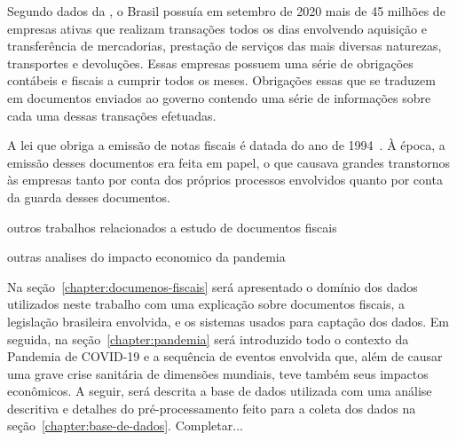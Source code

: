\newcommand{\comando}[1]{\textbf{$\backslash$#1}}

Segundo dados da , o Brasil possuía em setembro de 2020 mais de 45 milhões de empresas ativas que realizam transações todos os dias envolvendo aquisição e transferência de mercadorias, prestação de serviços das mais diversas naturezas, transportes e devoluções. Essas empresas possuem uma série de obrigações contábeis e fiscais a cumprir todos os meses. Obrigações essas que se traduzem em documentos enviados ao governo contendo uma série de informações sobre cada uma dessas transações efetuadas.

A lei que obriga a emissão de notas fiscais é datada do ano de 1994~\cite{lei:8846:documentos-fiscais}. À época, a emissão desses documentos era feita em papel, o que causava grandes transtornos às empresas tanto por conta dos próprios processos envolvidos quanto por conta da guarda desses documentos.

outros trabalhos relacionados a estudo de documentos fiscais

outras analises do impacto economico da pandemia

Na seção~\ref{chapter:documenos-fiscais} será apresentado o domínio dos dados utilizados neste trabalho com uma explicação sobre documentos fiscais, a legislação brasileira envolvida, e os sistemas usados para captação dos dados. Em seguida, na seção~\ref{chapter:pandemia} será introduzido todo o contexto da Pandemia de COVID-19 e a sequência de eventos envolvida que, além de causar uma grave crise sanitária de dimensões mundiais, teve também seus impactos econômicos. A seguir, será descrita a base de dados utilizada com uma análise descritiva e detalhes do pré-processamento feito para a coleta dos dados na seção~\ref{chapter:base-de-dados}. Completar...
